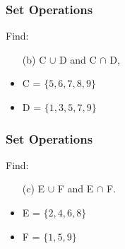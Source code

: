 \documentclass{beamer}
\begin{document}
	\begin{frame}
		\frametitle{Set Operations}
		\Large
		\vspace{-3cm}
		Find: 
		\begin{itemize}
			\item[(b)] C $\cup$ D and C $\cap$ D,  \bigskip
			\item C = $\{5, 6, 7, 8, 9\}$
			\item D = $\{1, 3, 5, 7, 9\}$
		\end{itemize}
		
	\end{frame}
	\begin{frame}
		\frametitle{Set Operations}
		\vspace{-3cm}
		\Large
		Find: 
		\begin{itemize}
			\item[(c)] E $\cup$ F and E $\cap$ F. \bigskip
			\item E = $\{2, 4, 6, 8\}$
			
			\item F = $\{1, 5, 9\}$
		\end{itemize}
		
	\end{frame}
	
\end{document}
